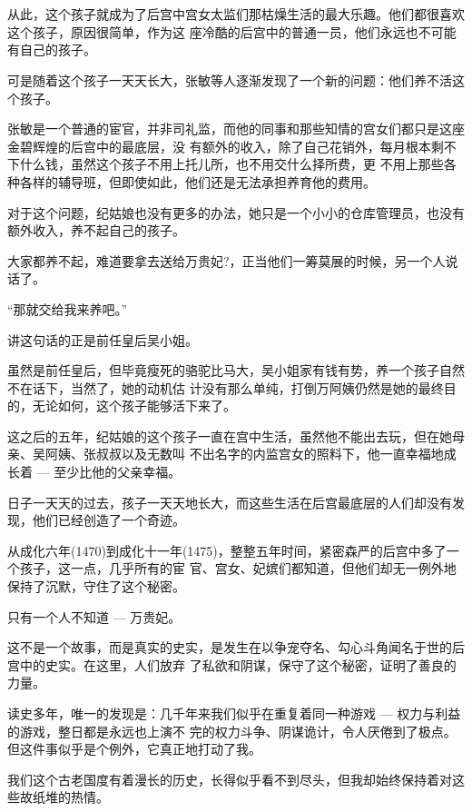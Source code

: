 \documentclass[11pt,a4paper,onecolumn]{article}
\begin{document}
\section[\thesection]{}

从此，这个孩子就成为了后宫中宫女太监们那枯燥生活的最大乐趣。他们都很喜欢这个孩子，原因很简单，作为这
座冷酷的后宫中的普通一员，他们永远也不可能有自己的孩子。

可是随着这个孩子一天天长大，张敏等人逐渐发现了一个新的问题：他们养不活这个孩子。

张敏是一个普通的宦官，并非司礼监，而他的同事和那些知情的宫女们都只是这座金碧辉煌的后宫中的最底层，没
有额外的收入，除了自己花销外，每月根本剩不下什么钱，虽然这个孩子不用上托儿所，也不用交什么择所费，更
不用上那些各种各样的辅导班，但即使如此，他们还是无法承担养育他的费用。

对于这个问题，纪姑娘也没有更多的办法，她只是一个小小的仓库管理员，也没有额外收入，养不起自己的孩子。

大家都养不起，难道要拿去送给万贵妃?，正当他们一筹莫展的时候，另一个人说话了。

``那就交给我来养吧。''

讲这句话的正是前任皇后吴小姐。

虽然是前任皇后，但毕竟瘦死的骆驼比马大，吴小姐家有钱有势，养一个孩子自然不在话下，当然了，她的动机估
计没有那么单纯，打倒万阿姨仍然是她的最终目的，无论如何，这个孩子能够活下来了。

这之后的五年，纪姑娘的这个孩子一直在宫中生活，虽然他不能出去玩，但在她母亲、吴阿姨、张叔叔以及无数叫
不出名字的内监宫女的照料下，他一直幸福地成长着 --- 至少比他的父亲幸福。

日子一天天的过去，孩子一天天地长大，而这些生活在后宫最底层的人们却没有发现，他们已经创造了一个奇迹。

从成化六年(1470)到成化十一年(1475)，整整五年时间，紧密森严的后宫中多了一个孩子，这一点，几乎所有的宦
官、宫女、妃嫔们都知道，但他们却无一例外地保持了沉默，守住了这个秘密。

只有一个人不知道 --- 万贵妃。

这不是一个故事，而是真实的史实，是发生在以争宠夺名、勾心斗角闻名于世的后宫中的史实。在这里，人们放弃
了私欲和阴谋，保守了这个秘密，证明了善良的力量。

读史多年，唯一的发现是：几千年来我们似乎在重复着同一种游戏 --- 权力与利益的游戏，整日都是永远也上演不
完的权力斗争、阴谋诡计，令人厌倦到了极点。但这件事似乎是个例外，它真正地打动了我。

我们这个古老国度有着漫长的历史，长得似乎看不到尽头，但我却始终保持着对这些故纸堆的热情。
\end{document}
